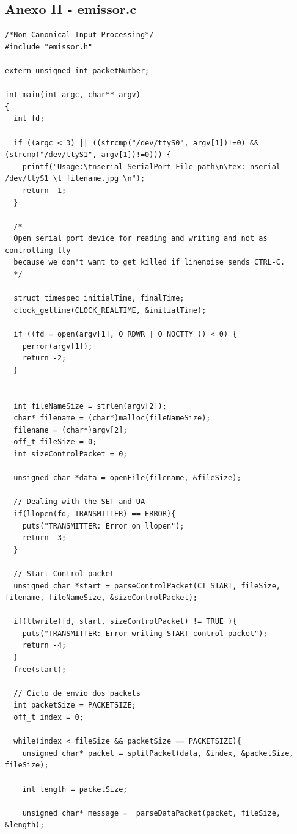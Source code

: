 \documentclass[11pt]{article}
\begin{document}
\pagebreak

\subsection{Anexo II - emissor.c}

\begin{lstlisting}[style=CStyle]
/*Non-Canonical Input Processing*/
#include "emissor.h"

extern unsigned int packetNumber;

int main(int argc, char** argv)
{
  int fd;

  if ((argc < 3) || ((strcmp("/dev/ttyS0", argv[1])!=0) && (strcmp("/dev/ttyS1", argv[1])!=0))) {
    printf("Usage:\tnserial SerialPort File path\n\tex: nserial /dev/ttyS1 \t filename.jpg \n");
    return -1;
  }

  /*
  Open serial port device for reading and writing and not as controlling tty
  because we don't want to get killed if linenoise sends CTRL-C.
  */
  
  struct timespec initialTime, finalTime;
  clock_gettime(CLOCK_REALTIME, &initialTime);

  if ((fd = open(argv[1], O_RDWR | O_NOCTTY )) < 0) {
    perror(argv[1]);
    return -2;
  }


  int fileNameSize = strlen(argv[2]);
  char* filename = (char*)malloc(fileNameSize);
  filename = (char*)argv[2];
  off_t fileSize = 0;
  int sizeControlPacket = 0;

  unsigned char *data = openFile(filename, &fileSize);

  // Dealing with the SET and UA
  if(llopen(fd, TRANSMITTER) == ERROR){
    puts("TRANSMITTER: Error on llopen");
    return -3;
  }

  // Start Control packet
  unsigned char *start = parseControlPacket(CT_START, fileSize, filename, fileNameSize, &sizeControlPacket);

  if(llwrite(fd, start, sizeControlPacket) != TRUE ){
    puts("TRANSMITTER: Error writing START control packet");
    return -4;
  }
  free(start);

  // Ciclo de envio dos packets
  int packetSize = PACKETSIZE;
  off_t index = 0;

  while(index < fileSize && packetSize == PACKETSIZE){
    unsigned char* packet = splitPacket(data, &index, &packetSize, fileSize);

    int length = packetSize;
    
    unsigned char* message =  parseDataPacket(packet, fileSize, &length);


\end{lstlisting}
\end{document}
